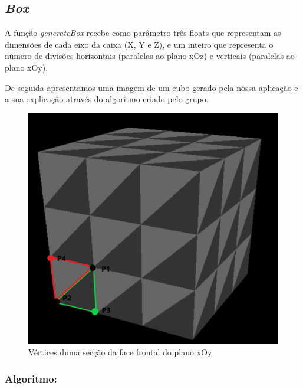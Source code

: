 \documentclass[a4paper]{article}
\begin{document}
\newpage

\subsection{\textit{Box}}
\label{sec:box}
A função \textit{generateBox} recebe como parâmetro três floats que representam as dimensões de cada eixo da caixa (X, Y e Z), e um inteiro que representa o número de divisões horizontais (paralelas ao plano xOz) e verticais (paralelas ao plano xOy).

De seguida apresentamos uma imagem de um cubo gerado pela nossa aplicação e a sua explicação através do algoritmo criado pelo grupo.

\begin{figure}[H]
\centering
\includegraphics[scale=0.55]{box.png}
\caption{Vértices duma secção da face frontal do plano xOy}
\label{img:Box}
\end{figure}

  \vspace{0.2cm}

\subsubsection{Algoritmo:}
\end{document}
